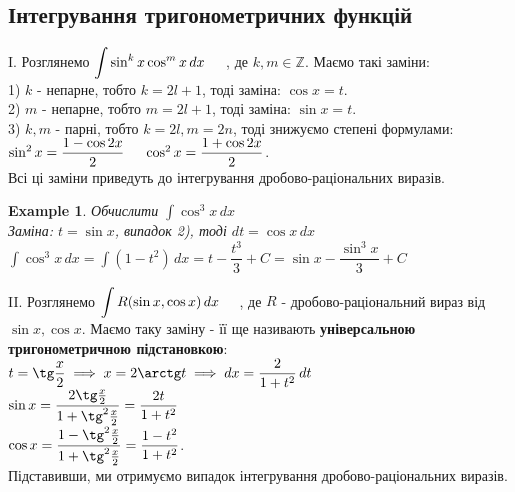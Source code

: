 \documentclass[a4paper, 10pt]{article}
\def\huge{\displaystyle}
\theoremstyle{theoremdd}
\theoremstyle{theoremdd}
\theoremstyle{theoremdd}
\theoremstyle{theoremdd}
\theoremstyle{theoremdd}
\newtheorem{example}[theorem]{Example}
\theoremstyle{theoremdd}
\theoremstyle{theoremdd}
\theoremstyle{theoremdd}
\theoremstyle{theoremdd}
\begin{document}
\subsection{Інтегрування тригонометричних функцій}
I. Розглянемо $\huge \int \sin^k x \cos^m x \,dx \hspace{0.5cm}$, де $k,m \in \mathbb{Z}$. Маємо такі заміни:\\
1) $k$ - непарне, тобто $k = 2l+1$, тоді заміна: $\cos x = t$.
\bigskip \\
2) $m$ - непарне, тобто $m = 2l+1$, тоді заміна: $\sin x = t$.
\bigskip \\
3) $k,m$ - парні, тобто $k=2l, m =2n$, тоді знижуємо степені формулами: \\ $\sin^2 x = \dfrac{1-\cos 2x}{2} \hspace{0.5cm} \cos^2 x = \dfrac{1+\cos 2x}{2}$.
\bigskip \\
Всі ці заміни приведуть до інтегрування дробово-раціональних виразів.

\begin{example}
Обчислити $\huge\int \cos^3 x \,dx$\\
Заміна: $t = \sin x$, випадок 2), тоді $dt = \cos x \,dx$\\
$\huge\int \cos^3 x \,dx = \int (1-t^2)\,dx = t - \dfrac{t^3}{3} + C = \sin x - \dfrac{\sin^3 x}{3} + C$
\end{example}

II. Розглянемо $\huge \int R(\sin x, \cos x)\,dx \hspace{0.5cm}$, де $R$ - дробово-раціональний вираз від $\sin x, \cos x$. Маємо таку заміну - її ще називають \textbf{універсальною тригонометричною підстановкою}:\\
$t = \tg \dfrac{x}{2} \implies x = 2 \arctg t \implies dx = \dfrac{2}{1+t^2}\,dt$\\
$\sin x = \dfrac{2 \tg \frac{x}{2}}{1 + \tg^2 \frac{x}{2}} = \dfrac{2t}{1+t^2}$\\
$\cos x = \dfrac{1 - \tg^2 \frac{x}{2}}{1 + \tg^2 \frac{x}{2}} = \dfrac{1-t^2}{1+t^2}$.\\
Підставивши, ми отримуємо випадок інтегрування дробово-раціональних виразів.
\end{document}
